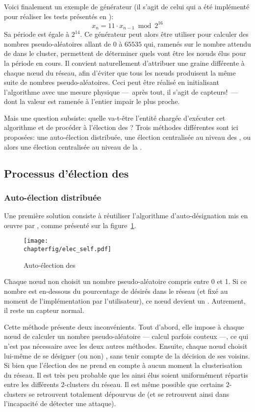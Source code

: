 Voici finalement un exemple de générateur (il s'agit de celui qui a été implémenté pour réaliser les tests présentés en ):
\[x_n=11\cdot x_{n-1}\bmod2^{16}\]
Sa période est égale à $2^{14}$.
Ce générateur peut alors être utiliser pour calculer des nombres pseudo-aléatoires allant de $0$ à $65535$ qui, ramenés sur le nombre attendu de \cns dans le cluster, permettent de déterminer quels vont être les nœuds élus pour la période en cours.
Il convient naturellement d'attribuer une graine différente à chaque nœud du réseau, afin d'éviter que tous les nœuds produisent la même suite de nombres pseudo-aléatoires.
Ceci peut être réalisé en initialisant l'algorithme avec une mesure physique ---~après tout, il s'agit de capteurs!~--- dont la valeur est ramenée à l'entier impair le plus proche.

Mais une question subsiste: quelle va-t-être l'entité chargée d'exécuter cet algorithme et de procéder à l'élection des \cns?
Trois méthodes différentes sont ici proposées: une auto-élection distribuée, une élection centralisée au niveau des \CH, ou alors une élection centralisée au niveau de la \sdb.
    \subsection{Processus d'élection des \cns}

        \subsubsection{Auto-élection distribuée}
Une première solution consiste à réutiliser l'algorithme d'auto-désignation mis en œuvre par \leach, comme présenté sur la figure~\ref{sa:fig:elecself}.
\begin{figure}[ht]
    \centering
    \texttt{[image: \\chapterfig/elec\_self.pdf]}
    \caption{Auto-élection des \cns}\label{sa:fig:elecself}
\end{figure}
Chaque nœud non \CH choisit un nombre pseudo-aléatoire compris entre 0 et 1.
Si ce nombre est en-dessous du pourcentage de \cns désirés dans le réseau (et fixé au moment de l'implémentation par l'utilisateur), ce nœud devient un \cn.
Autrement, il reste un capteur normal.

Cette méthode présente deux inconvénients.
Tout d'abord, elle impose à chaque nœud de calculer un nombre pseudo-aléatoire --- calcul parfois couteux ---, ce qui n'est pas nécessaire avec les deux autres méthodes.
Ensuite, chaque nœud choisit lui-même de se désigner (ou non) \cn, sans tenir compte de la décision de ses voisins.
Si bien que l'élection des \cns ne prend en compte à aucun moment la clusterisation du réseau.
Il est très peu probable que les \cns ainsi élus soient uniformément répartis entre les différents $2$-clusters du réseau.
Il est même possible que certains $2$-clusters se retrouvent totalement dépourvus de \cns (et se retrouvent ainsi dans l'incapacité de détecter une attaque).

